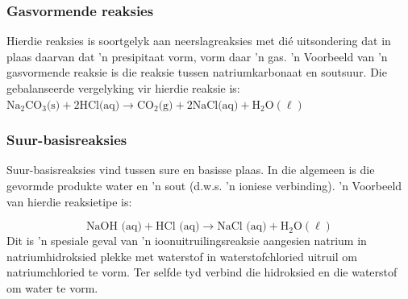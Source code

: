{{\subsubsection*{Gasvormende reaksies}
Hierdie reaksies is soortgelyk aan neerslagreaksies met dié uitsondering dat in plaas daarvan dat  'n presipitaat vorm, vorm daar  'n gas.  'n Voorbeeld van  'n gasvormende reaksie is die reaksie tussen natriumkarbonaat en soutsuur. Die gebalanseerde vergelyking vir hierdie reaksie is: \\
$\text{Na}_{2}\text{CO}_{3} \text{(s)} + 2\text{HCl} \text{(aq)} \to \text{CO}_{2} \text{(g)} + 2\text{NaCl} \text{(aq)} + \text{H}_{2}\text{O} (\ell)$ 
            \subsubsection*{Suur-basisreaksies}
            \nopagebreak
Suur-basisreaksies vind tussen sure en basisse plaas. In die algemeen is die gevormde produkte water en  'n sout (d.w.s.  'n ioniese verbinding).  'n Voorbeeld van hierdie reaksietipe is:\label{m38719*eid1534}\nopagebreak\noindent{}
	    
    \begin{equation*}
    \text{NaOH (aq)}+\text{HCl (aq)}\to \text{NaCl (aq)}+{\text{H}}_{2}\text{O} (\ell)
      \end{equation*}
Dit is  'n spesiale geval van  'n ioonuitruilingsreaksie aangesien natrium in natriumhidroksied plekke met waterstof in waterstofchloried uitruil om natriumchloried te vorm. Ter selfde tyd verbind die hidroksied en die waterstof om water te vorm. \par 
\label{m38719*eip-454}
}}
